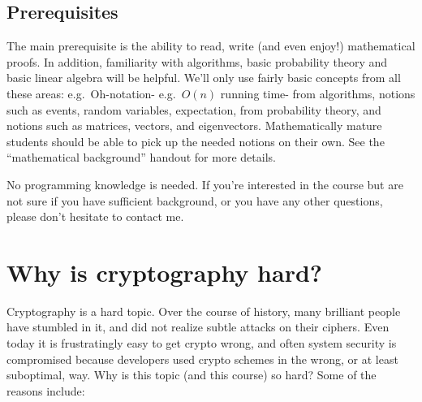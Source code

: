 \subsection{Prerequisites}\label{Prerequisites}

The main prerequisite is the ability to read, write (and even enjoy!)
mathematical proofs. In addition, familiarity with algorithms, basic
probability theory and basic linear algebra will be helpful. We'll only
use fairly basic concepts from all these areas: e.g.~Oh-notation-
e.g.~\(O(n)\) running time- from algorithms, notions such as events,
random variables, expectation, from probability theory, and notions such
as matrices, vectors, and eigenvectors. Mathematically mature students
should be able to pick up the needed notions on their own. See the
``mathematical background'' handout for more details.

No programming knowledge is needed. If you're interested in the course
but are not sure if you have sufficient background, or you have any
other questions, please don't hesitate to contact me.

\section{Why is cryptography hard?}\label{Why-is-cryptography-hard}

Cryptography is a hard topic. Over the course of history, many brilliant
people have stumbled in it, and did not realize subtle attacks on their
ciphers. Even today it is frustratingly easy to get crypto wrong, and
often system security is compromised because developers used crypto
schemes in the wrong, or at least suboptimal, way. Why is this topic
(and this course) so hard? Some of the reasons include:

